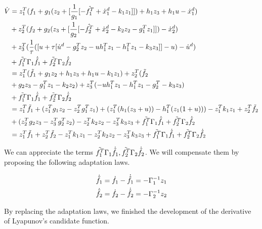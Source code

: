 \begin{align}
      \dot V &=  z^T_1 (f_1 + g_{1} (z_2 + [\frac{1}{g_{1}} [- \hat{f_1^T}  + \dot x^d_1 - k_1 z_1]]) + h_1 z_3 + h_1 u - \dot x^d_1) \nonumber \\
      &+ z^T_2 (f_2 + g_{2} (z_3 + [\frac{1}{g_{2}} [- \hat{f_2^T} + \dot x_{2}^d - k_2 z_2 - g_{1}^T z_1]]) - \dot x^d_2) \nonumber \\
      &+ z^T_3 (\frac{1}{\tau}([ u + \tau [\dot u^d - g_{2}^T z_2 - u h_1^T z_1 - h_{1}^T z_1 - k_3 z_3]] - u) - \dot u^d) \nonumber \\
      &+ \Tilde{f_1^T}  \Gamma_1 \dot{\Tilde{f_1}} + \Tilde{f_2^T} \Gamma_2 \dot{\Tilde{f_2}} \nonumber \\
      &= z^T_1 (\Tilde{f_1} + g_1 z_2  + h_1 z_3 + h_1 u - k_1 z_1) + z^T_2 (\Tilde{f_2} \nonumber \\
      &+ g_2 z_3 - g^T_1 z_1 - k_2 z_2) + z^T_3 (- u h_1^T z_1 - h_1^T z_1  - g_{2}^T - k_3 z_3) \nonumber \\
      &+ \Tilde{f_1^T}  \Gamma_1 \dot{\Tilde{f_1}} + \Tilde{f_2^T} \Gamma_2 \dot{\Tilde{f_2}} \nonumber \\
      &= z^T_1 \Tilde{f_1} + (z^T_1g_1 z_2 - z^T_2 g^T_1 z_1 ) + (z_1^T(h_1 (z_3 + u)) - h_1^T(z_1(1+u))) - z^T_1 k_1 z_1 + z^T_2 \Tilde{f_2} \nonumber \\ 
      &+ (z^T_2 g_2 z_3 - z^T_3 g_{2}^T z_2 ) -  z^T_2 k_2 z_2 - z^T_3  k_3 z_3 + \Tilde{f_1^T}  \Gamma_1 \dot{\Tilde{f_1}} + \Tilde{f_2^T} \Gamma_2 \dot{\Tilde{f_2}} \nonumber \\
      &= z^T_1 \Tilde{f_1} + z^T_2 \Tilde{f_2} - z^T_1 k_1 z_1 - z^T_2 k_2 z_2 -  z^T_3  k_3 z_3  + \Tilde{f_1^T}  \Gamma_1 \dot{\Tilde{f_1}} + \Tilde{f_2^T} \Gamma_2 \dot{\Tilde{f_2}}
\end{align}

We can appreciate the terms $\Tilde{f_1^T}  \Gamma_1 \dot{\Tilde{f_1}} ,  \Tilde{f_2^T} \Gamma_2 \dot{\Tilde{f_2}}$. We will compensate them by proposing the following adaptation laws. 

\begin{gather}
    \dot{\Tilde{f_1}} = \dot f_1 - \dot{\hat{f_1}} = - \Gamma_{1}^{-1} z_1 \\ \nonumber
    \dot{\Tilde{f_2}} = \dot f_2 - \dot{\hat{f_2}} = - \Gamma_{2}^{-1} z_2 \nonumber
\end{gather}

By replacing the adaptation laws, we finished the development of the derivative of Lyapunov's candidate function.  


